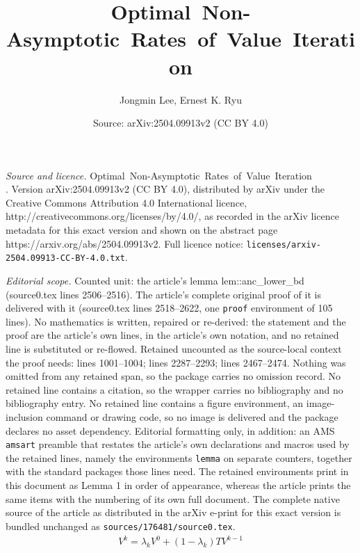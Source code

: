 \documentclass[10pt,a4paper]{amsart}
\title{{\!\!\!\mbox{Optimal Non-Asymptotic Rates of Value Iteration}}\\ \makebox[0pt][l]{\!\!\!for Average-Reward MDPs}}
\author{Jongmin Lee, Ernest K. Ryu}
\date{Source: arXiv:2504.09913v2 (CC BY 4.0)}
\begin{document}
\maketitle

\noindent\emph{Source and licence.} {\!\!\!\mbox{Optimal Non-Asymptotic Rates of Value Iteration}}\\ . Version arXiv:2504.09913v2 (CC BY 4.0), distributed by arXiv under the Creative Commons Attribution 4.0 International licence, http://creativecommons.org/licenses/by/4.0/, as recorded in the arXiv licence metadata for this exact version and shown on the abstract page https://arxiv.org/abs/2504.09913v2. Full licence notice: \texttt{licenses/arxiv-2504.09913-CC-BY-4.0.txt}.\par\smallskip

\noindent\textit{Editorial scope.} Counted unit: the article's lemma lem::anc\_lower\_bd (source0.tex lines 2506--2516). The article's complete original proof of it is delivered with it (source0.tex lines 2518--2622, one \texttt{proof} environment of 105 lines). No mathematics is written, repaired or re-derived: the statement and the proof are the article's own lines, in the article's own notation, and no retained line is substituted or re-flowed.  Retained uncounted as the source-local context the proof needs: lines 1001--1004; lines 2287--2293; lines 2467--2474.  Nothing was omitted from any retained span, so the package carries no omission record.  No retained line contains a citation, so the wrapper carries no bibliography and no bibliography entry.  No retained line contains a figure environment, an image-inclusion command or drawing code, so no image is delivered and the package declares no asset dependency.  Editorial formatting only, in addition: an AMS \texttt{amsart} preamble that restates the article's own declarations and macros used by the retained lines, namely the environments \texttt{lemma} on separate counters, together with the standard packages those lines need.  The retained environments print in this document as Lemma 1 in order of appearance, whereas the article prints the same items with the numbering of its own full document.  The complete native source of the article as distributed in the arXiv e-print for this exact version is bundled unchanged as \texttt{sources/176481/source0.tex}.
\begin{align}
    V^k  =\lambda_k V^0 +(1-\lambda_k)TV^{k-1} \tag{Anc-VI}
    \label{eq:Anc-VI}
\end{align}
\end{document}
